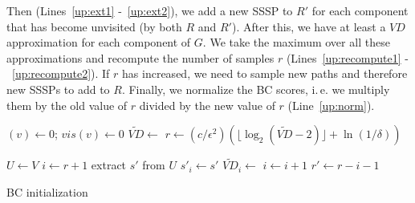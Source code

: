 \documentclass[english]{llncs}
\newcommand{\ie}{i.\,e.\xspace}
\newcommand{\vd}{$\mathit{VD}$\xspace}
\newcommand{\vda}{$\tilde{\mathit{VD}}$\xspace}
\begin{document}
Then (Lines~\ref{up:ext1} -~\ref{up:ext2}), we add a new SSSP to $R'$ for each component that has become unvisited (by both $R$ and $R'$). After this, we have at least a \vd approximation for each component of $G$. We take the maximum over all these approximations and recompute the number of samples $r$ (Lines~\ref{up:recompute1} -~\ref{up:recompute2}). If $r$ has increased, we need to sample new paths and therefore new SSSPs to add to $R$. Finally, we normalize the BC scores, \ie we multiply them by the old value of $r$ divided by the new value of $r$ (Line~\ref{up:norm}).


\begin{algorithm}[h]
 \begin{footnotesize}
\LinesNumbered
{}
{
	\B$(v)\leftarrow 0$; $vis(v) \leftarrow 0$\; \label{init:init}
}
\vda$\leftarrow$\; \label{init:sampling1}
$r \leftarrow (c/\epsilon^2) (\lfloor \log_2(\tilde{\mathit{VD}}-2)\rfloor +\ln(1/\delta))$\;

\label{sampling2} \label{init:sampling2}
$U \leftarrow V$\;
$i \leftarrow r+1$\;
{\label{init:newsamples1}
	extract $s'$ from $U$\;
	{
		 $s'_i \leftarrow s'$\;
		$\tilde{\mathit{VD}}_i \leftarrow$ \;
		$i \leftarrow i+1$\;
	}
}\label{init:newsamples2}
$r' \leftarrow r-i-1$\;
\end{footnotesize}
\caption{BC initialization}
\label{algo:init}
\end{algorithm}
\end{document}
